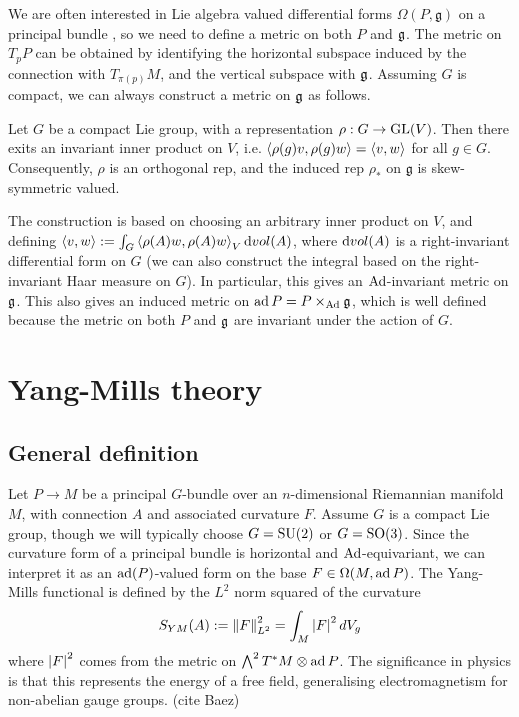 We are often interested in Lie algebra valued differential forms 
$\Omega(P,\mathfrak{g})$ on a principal bundle , so we need to define a metric 
on both $P$ and $\operatorname{\mathfrak{g}}$. The metric on $T_pP$ can be obtained by identifying the 
horizontal subspace induced by the connection with  $T_{\pi(p)}M$, and the vertical
subspace with $\operatorname{\mathfrak{g}}$. Assuming $G$ is compact, we can always construct a metric on
 $\operatorname{\mathfrak{g}}$ as follows.
 \begin{thm} \label{thm:lie_inner_product}
	Let $G$ be a compact Lie group, with a representation  $\rho : G \to\operatorname{GL}(V)$.
	Then there exits an invariant inner product on  $V$, i.e. 
	$\gen{\rho(g)v,\rho(g)w} = \gen{v,w}$ for all $g\in G$. Consequently,
	$\rho$ is an orthogonal rep, and the induced rep $\rho_*$ on
	$\mathfrak{g}$ is skew-symmetric valued. 
\end{thm}
The construction is based on choosing an arbitrary inner product on $V$, and
defining $\gen{v,w} := \int_G \gen{\rho(A)w,\rho(A)w}_V \odif{vol}(A)$, where
$\odif{vol}(A)$ is a right-invariant differential form on $G$ (we can also
construct the integral based on the right-invariant Haar measure on $G$).
In particular, this gives an $\operatorname{Ad}$-invariant metric on $\operatorname{\mathfrak{g}}$. 
This also gives an induced metric on $\operatorname{ad} P = P\times_{\operatorname{Ad}}\operatorname{\mathfrak{g}}$, which is well 
defined because the metric on both $P$ and  $\operatorname{\mathfrak{g}}$ are invariant under the action 
of  $G$. 

\section{Yang-Mills theory}

\subsection{General definition}
Let $P\to M$ be a principal $G$-bundle over an $n$-dimensional Riemannian 
manifold $M$, with connection $A$ and associated curvature $F$. 
Assume $G$ is a compact Lie group,
though we will typically choose $G=\operatorname{SU}(2)$ or $G=\operatorname{SO}(3)$. 
Since the curvature form of a principal bundle is horizontal and  
$\operatorname{Ad}$-equivariant, we can interpret it as an $\operatorname{ad}(P)$-valued form on the base 
$F\in\Omega(M,\operatorname{ad} P)$.
The Yang-Mills functional is defined by the $L^2$ norm squared of the curvature 
\[
	S_{YM}(A) := \norm{F}^2_{L^2} = \int_M \abs{F}^2 dV_g
\]
where $\abs{F}^2$ comes from the metric on $\bigwedge^2T^*M\otimes \operatorname{ad} P$. 
The significance in physics is that this represents the energy of a free field, 
generalising electromagnetism for non-abelian gauge groups.  
(cite Baez)

